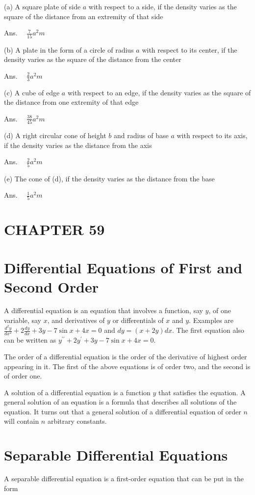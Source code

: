 \documentclass[10pt]{article}
\begin{document}
(a) A square plate of side $a$ with respect to a side, if the density varies as the square of the distance from an extremity of that side

Ans. $\quad \frac{7}{15} a^{2} m$

(b) A plate in the form of a circle of radius $a$ with respect to its center, if the density varies as the square of the distance from the center

Ans. $\quad \frac{2}{3} a^{2} m$

(c) A cube of edge $a$ with respect to an edge, if the density varies as the square of the distance from one extremity of that edge

Ans. $\quad \frac{38}{45} a^{2} m$

(d) A right circular cone of height $b$ and radius of base $a$ with respect to its axis, if the density varies as the distance from the axis

Ans. $\quad \frac{2}{5} a^{2} m$

(e) The cone of (d), if the density varies as the distance from the base

Ans. $\quad \frac{1}{5} a^{2} m$

\section*{CHAPTER 59}
\section*{Differential Equations of First and Second Order}
A differential equation is an equation that involves a function, say $y$, of one variable, say $x$, and derivatives of $y$ or differentials of $x$ and $y$. Examples are $\frac{d^{2} y}{d x^{2}}+2 \frac{d y}{d x}+3 y-7 \sin x+4 x=0$ and $d y=(x+2 y) d x$. The first equation also can be written as $y^{\prime \prime}+2 y^{\prime}+3 y-7 \sin x+4 x=0$.

The order of a differential equation is the order of the derivative of highest order appearing in it. The first of the above equations is of order two, and the second is of order one.

A solution of a differential equation is a function $y$ that satisfies the equation. A general solution of an equation is a formula that describes all solutions of the equation. It turns out that a general solution of a differential equation of order $n$ will contain $n$ arbitrary constants.

\section*{Separable Differential Equations}
A separable differential equation is a first-order equation that can be put in the form
\end{document}
